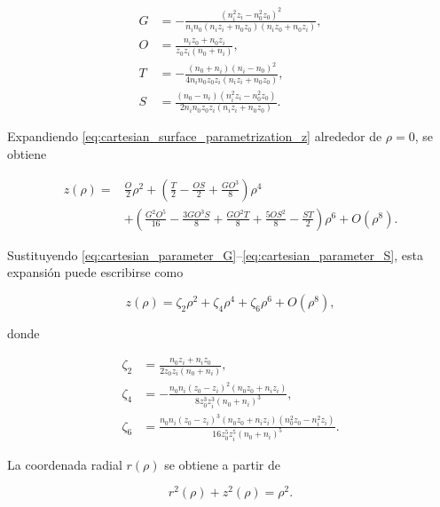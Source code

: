 \begin{align}
G
&=
-
\frac{
(n_i^2z_i-n_0^2z_0)^2
}{
n_in_0
(n_iz_i+n_0z_0)
(n_iz_0+n_0z_i)
},
\label{eq:cartesian_parameter_G}
\\[6pt]
O
&=
\frac{
n_iz_0+n_0z_i
}{
z_0z_i(n_0+n_i)
},
\label{eq:cartesian_parameter_O}
\\[6pt]
T
&=
-
\frac{
(n_0+n_i)(n_i-n_0)^2
}{
4n_in_0z_0z_i(n_iz_i+n_0z_0)
},
\label{eq:cartesian_parameter_T}
\\[6pt]
S
&=
\frac{
(n_0-n_i)(n_i^2z_i-n_0^2z_0)
}{
2n_in_0z_0z_i(n_iz_i+n_0z_0)
}.
\label{eq:cartesian_parameter_S}
\end{align}

Expandiendo \eqref{eq:cartesian_surface_parametrization_z} alrededor de \(\rho=0\), se obtiene

\begin{align}
z(\rho)
=
{}&
\frac{O}{2}\rho^2
+
\left(
\frac{T}{2}
-
\frac{OS}{2}
+
\frac{GO^3}{8}
\right)\rho^4
\nonumber
\\[6pt]
&
+
\left(
\frac{G^2O^5}{16}
-
\frac{3GO^3S}{8}
+
\frac{GO^2T}{8}
+
\frac{5OS^2}{8}
-
\frac{ST}{2}
\right)\rho^6
+
O(\rho^8).
\label{eq:z_rho_series_expansion}
\end{align}

Sustituyendo \eqref{eq:cartesian_parameter_G}--\eqref{eq:cartesian_parameter_S}, esta expansión puede escribirse como

\begin{equation}
z(\rho)
=
\zeta_2\rho^2
+
\zeta_4\rho^4
+
\zeta_6\rho^6
+
O(\rho^8),
\label{eq:z_rho_series_substituted}
\end{equation}

donde

\begin{align}
\zeta_2
&=
\frac{
n_0z_i+n_iz_0
}{
2z_0z_i(n_0+n_i)
},
\label{eq:zeta_2_definition}
\\[6pt]
\zeta_4
&=
-
\frac{
n_0n_i(z_0-z_i)^2(n_0z_0+n_iz_i)
}{
8z_0^3z_i^3(n_0+n_i)^3
},
\label{eq:zeta_4_definition}
\\[6pt]
\zeta_6
&=
\frac{
n_0n_i(z_0-z_i)^3
(n_0z_0+n_iz_i)
(n_0^2z_0-n_i^2z_i)
}{
16z_0^5z_i^5(n_0+n_i)^5
}.
\label{eq:zeta_6_definition}
\end{align}

La coordenada radial \(r(\rho)\) se obtiene a partir de

\begin{equation}
r^2(\rho)+z^2(\rho)=\rho^2.
\label{eq:identity_r2_z2_rho2}
\end{equation}

